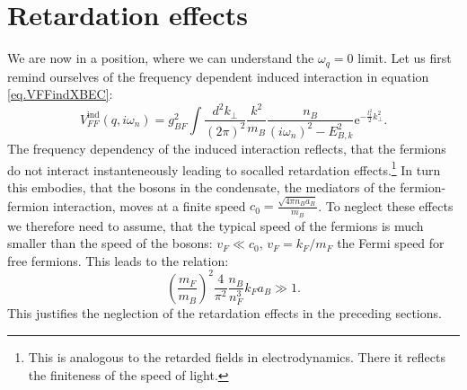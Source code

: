 \section{Retardation effects} \label{sec.RetardationEffects}
We are now in a position, where we can understand the $\omega_q = 0$ limit. Let us first remind ourselves of the frequency dependent induced interaction in equation \eqref{eq.VFFindXBEC}:
\begin{equation}
V_{FF}^\text{ind}(q,i\omega_n) = g_{BF}^2\int\frac{d^2k_\perp}{(2\pi)^2}\frac{k^2}{m_B}\frac{n_B}{(i\omega_n)^2-E_{B,k}^2}\text{e}^{-\frac{l_t^2}{2}k_\perp^2}. \nonumber
\end{equation}
The frequency dependency of the induced interaction reflects, that the fermions do not interact instanteneously leading to socalled retardation effects.\footnote{This is analogous to the retarded fields in electrodynamics. There it reflects the finiteness of the speed of light.} In turn this embodies, that the bosons in the condensate, the mediators of the fermion-fermion interaction, moves at a finite speed $c_0 = \frac{\sqrt{4\pi n_B a_B}}{m_B}$. To neglect these effects we therefore need to assume, that the typical speed of the fermions is much smaller than the speed of the bosons: $v_F \ll c_0$, $v_F = k_F/m_F$ the Fermi speed for free fermions. This leads to the relation:
\begin{equation}
\left(\frac{m_F}{m_B}\right)^2\frac{4}{\pi^2}\frac{n_B}{n_F^3}k_Fa_B \gg 1.
\label{eq.RetardationEffectsneglectionassumption}
\end{equation}
This justifies the neglection of the retardation effects in the preceding sections. 

